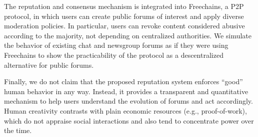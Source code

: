 \documentclass[12pt]{article}
\newcommand{\FC}       {Freechains\xspace}
\newcommand{\reps}     {\emph{reps}\xspace}
\begin{document}
The reputation and consensus mechanism is integrated into \FC, a P2P protocol,
in which users can create public forums of interest and apply diverse
moderation policies.
In particular, users can revoke content considered abusive according to the
majority, not depending on centralized authorities.
%
We simulate the behavior of existing chat and newsgroup forums as if they were
using \FC to show the practicability of the protocol as a descentralized
alternative for public forums.

Finally, we do not claim that the proposed reputation system enforces ``good''
human behavior in any way.
Instead, it provides a transparent and quantitative mechanism to help users
understand the evolution of forums and act accordingly.
Human creativity contrasts with plain economic resources (e.g.,
proof-of-work), which do not appraise social interactions and also tend
to concentrate power over the time.
%

\end{document}
